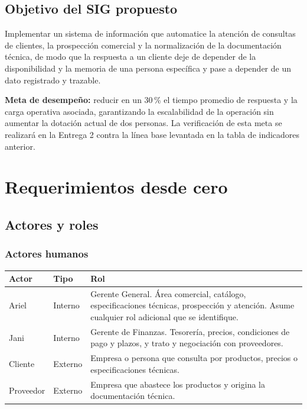 \documentclass{article}
\begin{document}
\subsection{Objetivo del SIG propuesto}

Implementar un sistema de información que automatice la atención de consultas de clientes, la prospección comercial y la normalización de la documentación técnica, de modo que la respuesta a un cliente deje de depender de la disponibilidad y la memoria de una persona específica y pase a depender de un dato registrado y trazable.

\medskip
\noindent\textbf{Meta de desempeño:} reducir en un 30\,\% el tiempo promedio de respuesta y la carga operativa asociada, garantizando la escalabilidad de la operación sin aumentar la dotación actual de dos personas. La verificación de esta meta se realizará en la Entrega 2 contra la línea base levantada en la tabla de indicadores anterior.

\section{Requerimientos desde cero}

\subsection{Actores y roles}

\subsubsection*{Actores humanos}

\begin{table}[H]
\centering
\begin{tabularx}{\textwidth}{llL}
\toprule
\textbf{Actor} & \textbf{Tipo} & \textbf{Rol} \\
\midrule
Ariel & Interno & Gerente General. Área comercial, catálogo, especificaciones técnicas, prospección y atención. Asume cualquier rol adicional que se identifique. \\
Jani & Interno & Gerente de Finanzas. Tesorería, precios, condiciones de pago y plazos, y trato y negociación con proveedores. \\
Cliente & Externo & Empresa o persona que consulta por productos, precios o especificaciones técnicas. \\
Proveedor & Externo & Empresa que abastece los productos y origina la documentación técnica. \\
\bottomrule
\end{tabularx}
\end{table}
\end{document}
